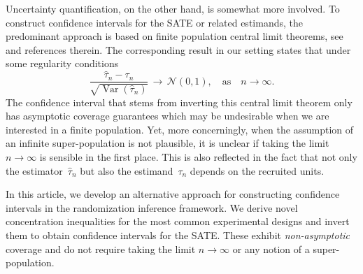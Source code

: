 \documentclass[aos]{imsart2}
\theoremstyle{plain}
\theoremstyle{definition}
\newcommand{\tauh}{\hat{\tau}}
\DeclareMathOperator{\var}{Var}
\begin{document}
Uncertainty quantification, on the other hand, is somewhat more involved. To construct confidence intervals for the SATE or related estimands, the predominant approach is based on finite population central limit theorems, see \citet{hajek_1960,li_general_2017} and references therein. The corresponding result in our setting states that under some regularity conditions
\begin{equation*}
    \frac{\tauh_n-\tau_n}{\sqrt{\var(\tauh_n)}} \,\to\, \mathcal{N}(0, 1),\quad \text{as}\quad n \to\infty.
\end{equation*}
The confidence interval that stems from inverting this central limit theorem only has asymptotic coverage guarantees which may be undesirable when we are interested in a finite population. Yet, more concerningly, when the assumption of an infinite super-population is not plausible, it is unclear if taking the limit $n\to \infty$ is sensible in the first place. This is also reflected in the fact that not only the estimator~$\tauh_n$ but also the estimand~$\tau_n$ depends on the recruited units.

In this article, we develop an alternative approach for constructing confidence intervals in the randomization inference framework. We derive novel concentration inequalities for the most common experimental designs and invert them to obtain confidence intervals for the SATE. These exhibit \emph{non-asymptotic} coverage and do not require taking the limit $n\to \infty$ or any notion of a super-population.








\end{document}
